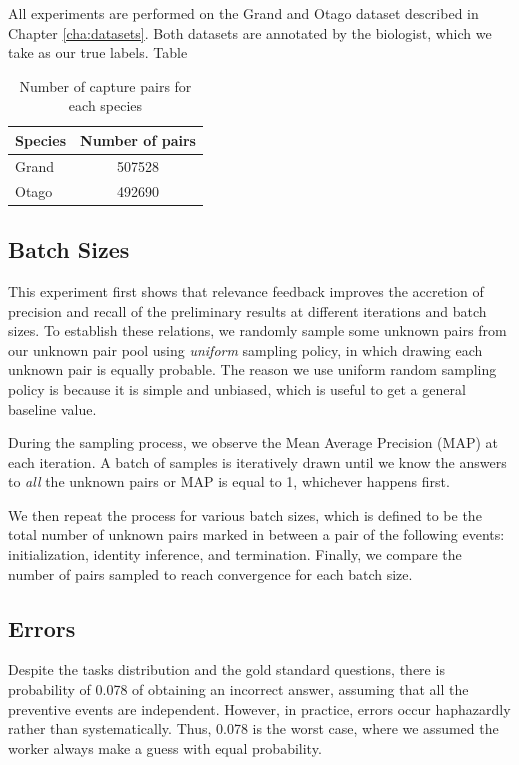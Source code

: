 All experiments are performed on the Grand and Otago dataset described in
Chapter \ref{cha:datasets}. Both datasets are annotated by the biologist, which
we take as our true labels. Table 

\begin{table}[t]
\captionsetup{justification=centering}
  \caption{Number of capture pairs for each species}
  \label{species-num-pairs} %
  \centering
  \begin{tabular}{lc}
    \toprule
    Species & Number of pairs \\
    \midrule
    Grand & 507528 \\
    Otago & 492690 \\
    \bottomrule
  \end{tabular}
\end{table}

\subsection{Batch Sizes} %
\label{sub:batch_sizes}

This experiment first shows that relevance feedback improves the accretion of
precision and recall of the preliminary results at different iterations and
batch sizes. To establish these relations, we randomly sample some unknown
pairs from our unknown pair pool using \emph{uniform} sampling policy, in which
drawing each unknown pair is equally probable. The reason we use uniform random
sampling policy is because it is simple and unbiased, which is useful to get a
general baseline value.

During the sampling process, we observe the Mean Average Precision (MAP) at
each iteration. A batch of samples is iteratively drawn until we know the
answers to \emph{all} the unknown pairs or MAP is equal to 1, whichever happens
first.

We then repeat the process for various batch sizes, which is defined to be the
total number of unknown pairs marked in between a pair of the following events:
initialization, identity inference, and termination. Finally, we compare the
number of pairs sampled to reach convergence for each batch size.

\subsection{Errors} %
\label{sub:errors}

Despite the tasks distribution and the gold standard questions, there is
probability of 0.078 of obtaining an incorrect answer, assuming that all the
preventive events are independent. However, in practice, errors occur
haphazardly rather than systematically. Thus, 0.078 is the worst case, where we
assumed the worker always make a guess with equal probability.

